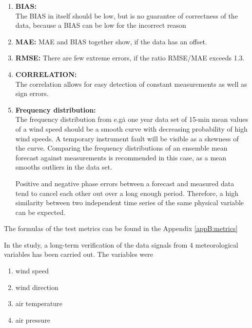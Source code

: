 \begin{enumerate}
    \vspace{-0.2cm}\item \textbf{BIAS:}\\
The BIAS in itself should be low, but is no guarantee of correctness of the data, because a BIAS can be low for the incorrect reason
    \vspace{-0.2cm}\item \textbf{MAE:}
MAE and BIAS together show, if the data has an offset. 
\vspace{-0.2cm}\item \textbf{RMSE:}
There are few extreme errors, if the ratio RMSE/MAE exceeds 1.3. 
    \vspace{-0.2cm}\item \textbf{CORRELATION:}\\
The correlation allows for easy detection of constant measurements as well as sign errors. 
    \vspace{-0.2cm}\item \textbf{Frequency distribution:}\\
The frequency distribution from e.g\. a one year data set of 15-min mean values of a wind speed should be a smooth curve with decreasing probability of high wind speeds. A temporary instrument fault will be visible as a skewness of the curve. 
Comparing the frequency distributions of an ensemble mean forecast against measurements is recommended in this case, as a mean smooths outliers in the data set.

Positive and negative phase errors between a forecast and measured data tend to cancel each other out over a long enough period. Therefore, a high similarity between two independent time series of the same physical variable can be expected. 
\end{enumerate}

The formulas of the test metrics can be found in the Appendix \ref{appB:metrics}


In the study, a long-term verification of the data signals from 4 meteorological variables has been carried out. The variables were 
\begin{enumerate}
    \vspace{-0.2cm}\item wind speed
    \vspace{-0.2cm}\item wind direction
    \vspace{-0.2cm}\item air temperature
    \vspace{-0.2cm}\item air pressure
\end{enumerate}

